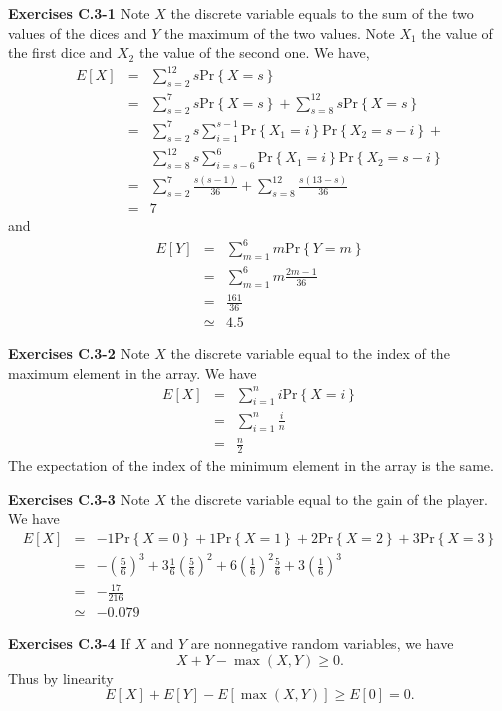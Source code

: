\documentclass[a4paper,12pt]{article}
\newcommand{\newpar}[1]
{\bigskip \noindent \textbf{Exercises #1} \newline}
\newcommand{\prob}[1]{\mathrm{Pr}\left\{ #1 \right\}}
\begin{document}
 \newpar{C.3-1}
Note $X$ the discrete variable equals to the sum of the two values of
the dices and $Y$ the maximum of the two values.  Note $X_1$ the value
of the first dice and $X_2$ the value of the second one.  We have,
\begin{eqnarray*}
  E[X] &=& \sum_{s=2}^{12} s \prob{X=s} \\
  &=& \sum_{s=2}^7 s \prob{X=s} + \sum_{s=8}^{12} s \prob{X=s} \\
  &=& \sum_{s=2}^7 s \sum_{i=1}^{s-1} \prob{X_1 = i}\prob{X_2 = s-i} +
  \\ && \sum_{s=8}^{12} s \sum_{i=s-6}^6\prob{X_1 = i} \prob{X_2 =
    s-i} \\
  &=& \sum_{s=2}^7 \frac{s(s-1)}{36} + \sum_{s=8}^{12}
  \frac{s(13-s)}{36} \\
  &=& 7
\end{eqnarray*}
and
\begin{eqnarray*}
  E[Y] &=& \sum_{m=1}^6 m \prob{Y=m} \\
  &=& \sum_{m=1}^6 m \frac{2m-1}{36} \\
  &=& \frac{161}{36} \\
  &\simeq& 4.5
\end{eqnarray*}

\newpar{C.3-2}
Note $X$ the discrete variable equal to the index of the maximum
element in the array.  We have
\begin{eqnarray*}
  E[X] &=& \sum_{i=1}^n i \prob{X = i} \\
  &=& \sum_{i=1}^n \frac{i}{n} \\
  &=& \frac{n}{2}
\end{eqnarray*}
The expectation of the index of the minimum element in the array is
the same.

\newpar{C.3-3}
Note $X$ the discrete variable equal to the gain of the player.  We
have
\begin{eqnarray*}
  E[X] &=& -1 \prob{X = 0} + 1 \prob{X = 1} + 2 \prob{X = 2} +
  3 \prob{X = 3} \\
  &=& - \left(\frac{5}{6}\right)^3 + 3\frac{1}{6}
  \left(\frac{5}{6}\right)^2 +
  6 \left(\frac{1}{6}\right)^2 \frac{5}{6} +
  3 \left(\frac{1}{6}\right)^3 \\
  &=& -\frac{17}{216} \\
  &\simeq& - 0.079
\end{eqnarray*}

\newpar{C.3-4}
If $X$ and $Y$ are nonnegative random variables, we have
\[ X + Y - \max(X,Y) \ge 0.\]
Thus by linearity
\[ E[X] + E[Y] - E[\max(X,Y)] \ge E[0] = 0.\]
\end{document}
